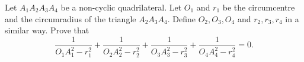 Let 
$A_1A_2A_3A_4$
 be a non-cyclic quadrilateral. Let 
$O_1$
 and 
$r_1$
 be the circumcentre and the circumradius of the triangle 
$A_2A_3A_4$.
 Define 
$O_2,O_3,O_4$
 and 
$r_2,r_3,r_4$
 in a similar way. Prove that
\[\frac{1}{O_1A_1^2-r_1^2}+\frac{1}{O_2A_2^2-r_2^2}+\frac{1}{O_3A_3^2-r_3^2}+\frac{1}{O_4A_4^2-r_4^2}=0.\]
